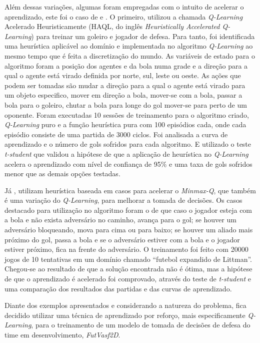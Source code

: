 Além dessas variações, algumas foram empregadas com o intuito de acelerar o aprendizado, este foi o
caso de  e . O primeiro, utilizou a chamada \textit{Q-Learning} Acelerado Heuristicamente (HAQL, do inglês
\textit{Heuristically Accelerated Q-Learning}) para treinar um goleiro e jogador de defesa. Para
tanto, foi identificada uma heurística aplicável ao domínio e implementada no algoritmo
\textit{Q-Learning} ao mesmo tempo que é feita a discretização do mundo. As variáveis de estado para
o algoritmo foram a posição dos agentes e da bola numa grade e a direção para a qual o agente está
virado definida por norte, sul, leste ou oeste. As ações que podem ser tomadas são mudar a direção
para a qual o agente está virado para um objeto especifico, mover em direção a bola, mover-se com a
bola, passar a bola para o goleiro, chutar a bola para longe do gol mover-se para perto de um
oponente. Foram executadas 10 sessões de treinamento para o algoritmo criado, \textit{Q-Learning}
puro e a função heurística pura com 100 episódios cada, onde cada episódio consiste de uma partida
de 3000 ciclos. Foi analisada a curva de aprendizado e o número de gols sofridos para cada
algoritmo. E utilizado o teste \textit{t-student} que validou a hipótese de que a aplicação de
heurística no \textit{Q-Learning} acelera o aprendizado com nível de confiança de 95\% e uma taxa de
gols sofridos menor que as demais opções testadas.

Já , utilizam heurística baseada em casos para acelerar o
\textit{Minmax-Q}, que também é uma variação do \textit{Q-Learning}, para melhorar a tomada de
decisões. Os casos destacado para utilização no algoritmo foram o de que caso o jogador esteja com a
bola e não exista adversário no caminho, avança para o gol; se houver um adversário bloqueando, mova
para cima ou para baixo; se houver um aliado mais próximo do gol, passa a bola e se o adversário
estiver com a bola e o jogador estiver próximo, fica na frente do adversário. O treinamento foi
feito com 20000 jogos de 10 tentativas em um domínio chamado ``futebol expandido de Littman''.
Chegou-se ao resultado de que a solução encontrada não é ótima, mas a hipótese de que o aprendizado
é acelerado foi comprovado, através do teste de \textit{t-student} e uma comparação dos resultados
das partidas e das curvas de aprendizado.

Diante dos exemplos apresentados e considerando a natureza do problema, fica decidido utilizar uma
técnica de aprendizado por reforço, mais especificamente \textit{Q-Learning}, para o treinamento de
um modelo de tomada de decisões de defesa do time em desenvolvimento, \textit{FutVasf2D}.

